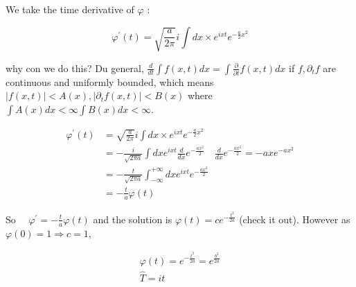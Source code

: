 \documentclass[10pt]{article}
\begin{document}
We take the time derivative of $\varphi$ :

$$
\varphi^{\prime}(t)=\sqrt{\frac{a}{2 \pi}} i \int d x \times e^{i x t} e^{-\frac{a}{2} x^{2}}
$$

why con we do this? Du general, $\frac{d}{d t} \int f(x, t) d x=\int \frac{\partial}{\partial t} f(x, t) d x$ if $f, \partial_{t} f$ are continuous and uniformly bounded, which means $|f(x, t)|<A(x),\left|\partial_{t} f(x, t)\right|<B(x)$ where $\int A(x) d x<\infty \int B(x) d x<\infty$.

$$
\begin{aligned}
\varphi^{\prime}(t) & =\sqrt{\frac{a}{2 \pi}} i \int d x \times e^{i x t} e^{-\frac{a}{2} x^{2}} \\
& =-\frac{i}{\sqrt{2 \pi a}} \int d x e^{i x t} \frac{d}{d x} e^{-\frac{a x^{2}}{2}} \quad \frac{d}{d x} e^{-\frac{a x^{2}}{2}}=-a x e^{-a x^{2}} \\
& =-\frac{t}{\sqrt{2 \pi a}} \int_{-\infty}^{+\infty} d x e^{i x t} e^{-\frac{a x^{2}}{2}} \\
& =-\frac{t}{a} \varphi(t)
\end{aligned}
$$

So $\quad \varphi^{\prime}=-\frac{t}{a} \varphi(t)$ and the solution is $\varphi(t)=c e^{-\frac{t^{2}}{2 a}}$ (check it out). However as $\varphi(0)=1 \Rightarrow c=1$,

$$
\begin{gathered}
\varphi(t)=e^{-\frac{t^{2}}{2 a}}=e^{\frac{b^{2}}{2 a}} \\
\hat{T}=i t
\end{gathered}
$$
\end{document}
